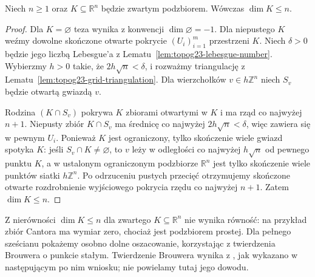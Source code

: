 \begin{twierdzenie}
\label{thm:topog23-euclidean-upper}
Niech \(n\ge1\) oraz
\(K\subseteq\mathbb R^n\)
będzie zwartym podzbiorem.
Wówczas \(\dim K\le n\).
\end{twierdzenie}
\begin{proof}
Dla \(K=\varnothing\) teza wynika
z konwencji \(\dim\varnothing=-1\).
Dla niepustego \(K\)
weźmy dowolne skończone otwarte pokrycie
\((U_i)_{i=1}^m\) przestrzeni \(K\).
Niech \(\delta>0\) będzie jego liczbą Lebesgue'a
z Lematu~\ref{lem:topog23-lebesgue-number}.
Wybierzmy \(h>0\) takie, że
\(2h\sqrt n<\delta\),
i rozważmy triangulację z
Lematu~\ref{lem:topog23-grid-triangulation}.
Dla wierzchołków \(v\in h\mathbb Z^n\)
niech \(S_v\) będzie otwartą gwiazdą \(v\).

Rodzina \((K\cap S_v)\)
pokrywa \(K\) zbiorami otwartymi w \(K\)
i ma rząd co najwyżej \(n+1\).
Niepusty zbiór \(K\cap S_v\)
ma średnicę co najwyżej
\(2h\sqrt n<\delta\),
więc zawiera się w pewnym \(U_i\).
Ponieważ \(K\) jest ograniczony,
tylko skończenie wiele gwiazd spotyka \(K\):
jeśli \(S_v\cap K\neq\varnothing\),
to \(v\) leży w odległości
co najwyżej \(h\sqrt n\)
od pewnego punktu \(K\),
a w ustalonym ograniczonym
podzbiorze \(\mathbb R^n\)
jest tylko skończenie wiele punktów
siatki \(h\mathbb Z^n\).
Po odrzuceniu pustych przecięć
otrzymujemy skończone otwarte rozdrobnienie
wyjściowego pokrycia rzędu co najwyżej \(n+1\).
Zatem \(\dim K\le n\).
\end{proof}

\begin{uwaga}
\label{rem:topog23-euclidean-lower}
Z nierówności \(\dim K\le n\)
dla zwartego \(K\subseteq\mathbb R^n\)
nie wynika równość:
na przykład zbiór Cantora ma wymiar zero,
chociaż jest podzbiorem prostej.
Dla pełnego sześcianu pokażemy osobno
dolne oszacowanie, korzystając z
twierdzenia Brouwera o punkcie stałym.
Twierdzenie Brouwera wynika z , jak wykazano w następującym po nim wniosku;
nie powielamy tutaj jego dowodu.
\end{uwaga}

